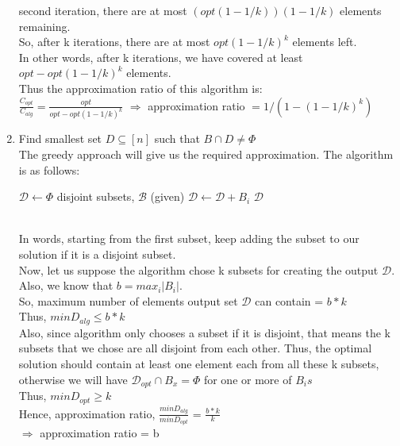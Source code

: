 \documentclass[11pt]{article}
\begin{document}
\begin{enumerate}
second iteration, there are at most $(opt(1 - 1/k))(1 - 1/k)$ elements remaining. \\
So, after k iterations, there are at most $opt(1 - 1/k)^k$ elements left. \\
In other words, after k iterations, we have covered at least $opt - opt(1 - 1/k)^k$ elements. \\
Thus the approximation ratio of this algorithm is: \\
$\frac{C_{opt}}{C_{alg}} = \frac{opt}{opt - opt(1- 1/k)^k} $
$\Longrightarrow$ approximation ratio $= 1/(1 - (1 - 1/k)^k)$
    \item Find smallest set $D \subseteq [n]$ such that $B \cap D \neq \Phi $ \\
    The greedy approach will give us the required approximation. The algorithm is as follows:   
    \begin{algorithm}
  \begin{algorithmic}
      \State $\mathcal{D} \leftarrow \Phi$
      \State disjoint subsets, $\mathcal{B}$ (given)
            \State $\mathcal{D} \leftarrow \mathcal{D} + B_i$
         \EndIf
        \EndFor
      \State \Return $\mathcal{D}$
    \EndFunction
  \end{algorithmic}
\end{algorithm}\\
In words, starting from the first subset, keep adding the subset to our solution if it is a disjoint subset. \\
Now, let us suppose the algorithm chose k subsets for creating the output $\mathcal{D}$. Also, we know that $b = max_i |B_i|$. \\
So, maximum number of elements output set $\mathcal{D}$ can contain = $b*k$\\
Thus, $minD_{alg} \leq b*k$ \\
Also, since algorithm only chooses a subset if it is disjoint, that means the k subsets that we chose are all disjoint from each other. 
Thus, the optimal solution should contain at least one element each from all these k subsets, otherwise we will have $\mathcal{D}_{opt} 
\cap B_x = \Phi$ for one or more of $B_i s$\\
Thus, $minD_{opt} \geq k$ \\
Hence, approximation ratio, $\frac{minD_{alg}}{minD_{opt}}$ = $\frac{b*k}{k}$ \\
$\Longrightarrow$ approximation ratio = b
\end{enumerate}
\end{document}
